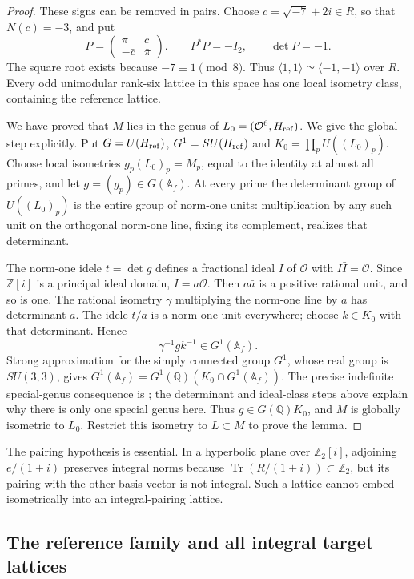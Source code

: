 \documentclass[11pt]{article}
\theoremstyle{definition}
\theoremstyle{remark}
\begin{document}
\begin{proof}
These signs can be removed in pairs.  Choose $c=\sqrt{-7}+2i\in R$,
so that $N(c)=-3$, and put
\[
 P=\begin{pmatrix}\pi&c\\-\bar c&\bar\pi\end{pmatrix}.
 \qquad P^*P=-I_2,\qquad\det P=-1.
\]
The square root exists because $-7\equiv1\pmod8$.
Thus $\langle1,1\rangle\simeq\langle-1,-1\rangle$ over $R$.
Every odd unimodular rank-six lattice in this space has one local
isometry class, containing the reference lattice.

We have proved that $M$ lies in the genus of
$L_0=(\mathcal O^6,H_{\rm ref})$.  We give the global step explicitly.
Put $G=U(H_{\rm ref})$, $G^1=SU(H_{\rm ref})$ and
$K_0=\prod_p U((L_0)_p)$.  Choose local isometries
$g_p(L_0)_p=M_p$, equal to the identity at almost all primes, and let
$g=(g_p)\in G(\mathbb A_f)$.
At every prime the determinant group of $U((L_0)_p)$ is the entire
group of norm-one units: multiplication by any such unit on the
orthogonal norm-one line, fixing its complement, realizes that determinant.

The norm-one idele $t=\det g$ defines a fractional ideal $I$ of
$\mathcal O$ with $I\bar I=\mathcal O$.
Since $\mathbb Z[i]$ is a principal ideal domain, $I=a\mathcal O$.
Then $a\bar a$ is a positive rational unit, and so is one.
The rational isometry $\gamma$ multiplying the norm-one line by $a$
has determinant $a$.  The idele $t/a$ is a norm-one unit everywhere;
choose $k\in K_0$ with that determinant.  Hence
\[
 \gamma^{-1}gk^{-1}\in G^1(\mathbb A_f).
\]
Strong approximation for the simply connected group
$G^1$, whose real group is $SU(3,3)$, gives
$G^1(\mathbb A_f)=G^1(\mathbb Q)(K_0\cap G^1(\mathbb A_f))$.
The precise indefinite special-genus consequence is
\cite[Remark~4.8(2), author p.~9]{GaussianKirschmer}; the determinant
and ideal-class steps above explain why there is only one special genus
here.  Thus $g\in G(\mathbb Q)K_0$, and $M$ is globally isometric to
$L_0$.  Restrict this isometry to $L\subset M$ to prove the lemma.
\end{proof}

The pairing hypothesis is essential.  In a hyperbolic plane over
$\mathbb Z_2[i]$, adjoining $e/(1+i)$ preserves integral norms because
$\operatorname{Tr}(R/(1+i))\subset\mathbb Z_2$, but its pairing with
the other basis vector is not integral.  Such a lattice cannot embed
isometrically into an integral-pairing lattice.

\subsection{The reference family and all integral target lattices}
\end{document}
